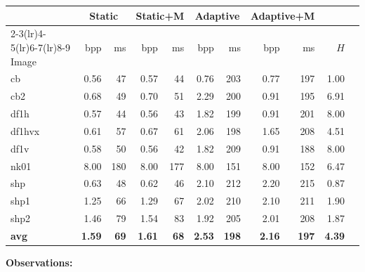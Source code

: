 \documentclass[a4paper,11pt]{article}
\begin{document}
\begin{center}
\small
\setlength{\tabcolsep}{4pt}
\begin{tabular}{lrrrrrrrrrr}
\toprule
 & \multicolumn{2}{c}{Static} & \multicolumn{2}{c}{Static+M} &
   \multicolumn{2}{c}{Adaptive} & \multicolumn{2}{c}{Adaptive+M} & \\
\cmidrule(lr){2-3}\cmidrule(lr){4-5}\cmidrule(lr){6-7}\cmidrule(lr){8-9}
Image & bpp & ms & bpp & ms & bpp & ms & bpp & ms & $H$ \\
\midrule
cb      & 0.56 &  47 & 0.57 &  44 & 0.76 & 203 & 0.77 & 197 & 1.00 \\
cb2     & 0.68 &  49 & 0.70 &  51 & 2.29 & 200 & 0.91 & 195 & 6.91 \\
df1h    & 0.57 &  44 & 0.56 &  43 & 1.82 & 199 & 0.91 & 201 & 8.00 \\
df1hvx  & 0.61 &  57 & 0.67 &  61 & 2.06 & 198 & 1.65 & 208 & 4.51 \\
df1v    & 0.58 &  50 & 0.56 &  42 & 1.82 & 209 & 0.91 & 188 & 8.00 \\
nk01    & 8.00 & 180 & 8.00 & 177 & 8.00 & 151 & 8.00 & 152 & 6.47 \\
shp     & 0.63 &  48 & 0.62 &  46 & 2.10 & 212 & 2.20 & 215 & 0.87 \\
shp1    & 1.25 &  66 & 1.29 &  67 & 2.02 & 210 & 2.10 & 211 & 1.90 \\
shp2    & 1.46 &  79 & 1.54 &  83 & 1.92 & 205 & 2.01 & 208 & 1.87 \\
\midrule
\textbf{avg} & \textbf{1.59} & \textbf{69} & \textbf{1.61} & \textbf{68} & \textbf{2.53} & \textbf{198} & \textbf{2.16} & \textbf{197} & \textbf{4.39} \\
\bottomrule
\end{tabular}
\end{center}

\smallskip
\textbf{Observations:}
\end{document}
